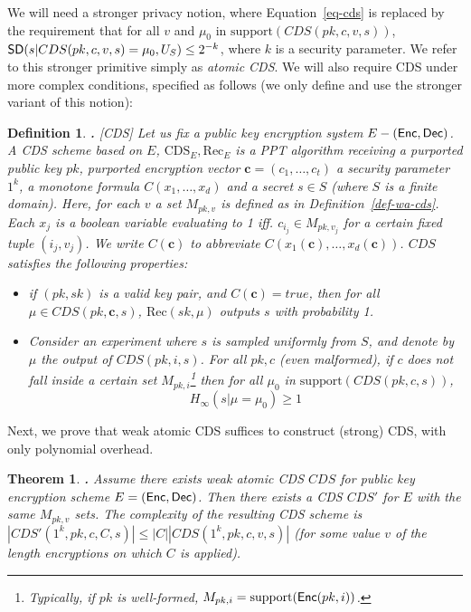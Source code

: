 \documentclass[11pt]{article}
\newcommand{\SD}{{\sf SD }}
\newcommand{\support}{{\mathrm{support}}}
\newtheorem{THEOREM}{Theorem}[section]
\newenvironment{theorem}{\begin{THEOREM} \hspace{-.85em} {\bf .} \rm}%
	{\end{THEOREM}}
\newtheorem{DEFINITION}{Definition}[section]
\newenvironment{definition}{\begin{DEFINITION} \hspace{-.85em} {\bf .} \rm}%
	{\end{DEFINITION}}
\newcommand{\enc}{{\sf Enc}}
\newcommand{\dec}{{\sf Dec}}
\begin{document}
We will need a stronger privacy notion, where Equation~\ref{eq-cds} is replaced by the requirement that for all $v$ and $\mu_0$ in $\support(CDS(pk,c,v,s))$, $\SD(s|CDS(pk,c,v,s)=\mu_0,U_S)\leq 2^{-k}$, where $k$ is a security parameter. We refer to this stronger primitive simply as \emph{atomic CDS}. 
We will also require CDS under more complex conditions, specified as follows (we only define and use the stronger variant of this notion):

\begin{definition}[CDS]
	Let us fix a public key encryption system $E-(\enc,\dec)$. A CDS scheme based on $E$, $\text{CDS}_E,\text{Rec}_E$ is a PPT algorithm receiving a purported public key $pk$,
	purported encryption vector $\textbf{c}=(c_1,\ldots,c_t)$
	 a security parameter $1^k$, a monotone formula $C(x_1,\ldots,x_d)$ and a secret $s\in S$ (where $S$ is a finite domain). Here, for each $v$ a set $M_{pk,v}$ is defined as in Definition~\ref{def-wa-cds}.
	Each $x_j$ is a boolean variable evaluating to 1 iff.
	$c_{i_j}\in M_{pk,v_j}$ for a certain fixed tuple $(i_j,v_j)$. We
	write $C(\textbf{c})$ to abbreviate $C(x_1(\textbf{c}),\ldots,x_d(\textbf{c}))$.
	$CDS$ satisfies the following properties:
	\begin{itemize}
		\item[Correctness:] if $(pk,sk)$ is a valid key pair, and $C(\textbf{c})=true$, then for all $\mu \in CDS(pk,\textbf{c},s)$, $\text{Rec}(sk,\mu)$ outputs $s$ with probability 1.
		\item[Hiding:] Consider an experiment where $s$ is sampled uniformly from $S$, and denote by $\mu$ the output of $CDS(pk,i,s)$. For all $pk,c$ (even malformed), if $c$ does not fall inside a certain set $M_{pk,i}$\;\footnote{Typically, if $pk$ is well-formed, $M_{pk,i}=\support(\enc(pk,i))$.}  then for all $\mu_0$ in $\support(CDS(pk,c,s))$,	
		\begin{equation}\label{eq-cds}
		H_\infty(s|\mu = \mu_0)\geq 1
		\end{equation}
	\end{itemize}
\end{definition} 

Next, we prove that weak atomic CDS suffices to construct (strong) 
CDS, with only polynomial overhead.

\begin{theorem}\label{thm-wacds-cds}
	Assume there exists weak atomic CDS $CDS$ for public key encryption scheme $E=(\enc,\dec)$. Then there exists a CDS $CDS'$ for $E$ with the same $M_{pk,v}$ sets. The complexity of the resulting CDS scheme is $|CDS'(1^k,pk,c,C,s)|\leq |C||CDS(1^k,pk,c,v,s)|$ (for some value $v$ of the length encryptions on which $C$ is applied).
\end{theorem}
\end{document}
